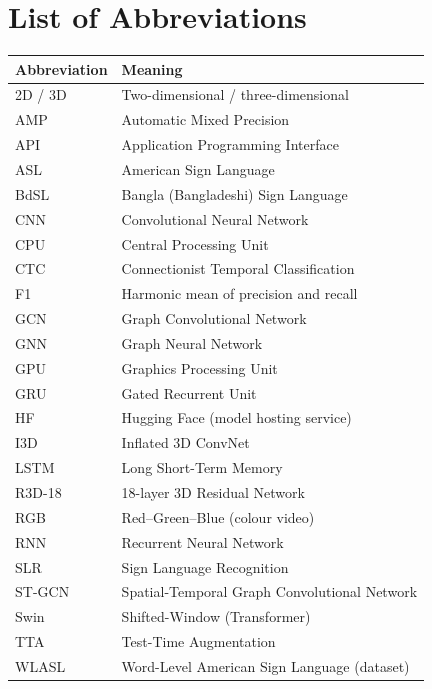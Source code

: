 \chapter*{List of Abbreviations}

\begin{longtable}{@{}p{3.2cm}p{11cm}@{}}
\toprule
\textbf{Abbreviation} & \textbf{Meaning} \\
\midrule
\endhead
2D / 3D     & Two-dimensional / three-dimensional \\
AMP         & Automatic Mixed Precision \\
API         & Application Programming Interface \\
ASL         & American Sign Language \\
BdSL        & Bangla (Bangladeshi) Sign Language \\
CNN         & Convolutional Neural Network \\
CPU         & Central Processing Unit \\
CTC         & Connectionist Temporal Classification \\
F1          & Harmonic mean of precision and recall \\
GCN         & Graph Convolutional Network \\
GNN         & Graph Neural Network \\
GPU         & Graphics Processing Unit \\
GRU         & Gated Recurrent Unit \\
HF          & Hugging Face (model hosting service) \\
I3D         & Inflated 3D ConvNet \\
LSTM        & Long Short-Term Memory \\
R3D-18      & 18-layer 3D Residual Network \\
RGB         & Red--Green--Blue (colour video) \\
RNN         & Recurrent Neural Network \\
SLR         & Sign Language Recognition \\
ST-GCN      & Spatial-Temporal Graph Convolutional Network \\
Swin        & Shifted-Window (Transformer) \\
TTA         & Test-Time Augmentation \\
WLASL       & Word-Level American Sign Language (dataset) \\
\bottomrule
\end{longtable}
